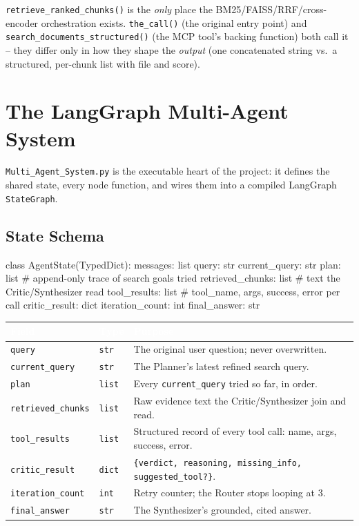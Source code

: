 \documentclass[11pt,a4paper]{article}
\begin{document}
\begin{successbox}
\texttt{retrieve\_ranked\_chunks()} is the \emph{only} place the
BM25/FAISS/RRF/cross-encoder orchestration exists. \texttt{the\_call()} (the
original entry point) and \texttt{search\_documents\_structured()} (the MCP
tool's backing function) both call it -- they differ only in how they shape
the \emph{output} (one concatenated string vs.\ a structured, per-chunk list
with file and score).
\end{successbox}



\clearpage
\section{The LangGraph Multi-Agent System}
\label{sec:langgraph}

\texttt{Multi\_Agent\_System.py} is the executable heart of the project: it
defines the shared state, every node function, and wires them into a
compiled LangGraph \texttt{StateGraph}.

\subsection{State Schema}

\begin{pycode}
class AgentState(TypedDict):
    messages: list
    query: str
    current_query: str
    plan: list                 # append-only trace of search goals tried
    retrieved_chunks: list     # text the Critic/Synthesizer read
    tool_results: list         # {tool_name, args, success, error} per call
    critic_result: dict
    iteration_count: int
    final_answer: str
\end{pycode}

\begin{tabularx}{\textwidth}{@{}l l X@{}}
\toprule
\rowcolor{navylight}
\textcolor{white}{\textbf{Field}} & \textcolor{white}{\textbf{Type}} & \textcolor{white}{\textbf{Purpose}} \\
\midrule
\texttt{query} & \texttt{str} & The original user question; never overwritten. \\
\texttt{current\_query} & \texttt{str} & The Planner's latest refined search query. \\
\texttt{plan} & \texttt{list} & Every \texttt{current\_query} tried so far, in order. \\
\texttt{retrieved\_chunks} & \texttt{list} & Raw evidence text the Critic/Synthesizer join and read. \\
\texttt{tool\_results} & \texttt{list} & Structured record of every tool call: name, args, success, error. \\
\texttt{critic\_result} & \texttt{dict} & \texttt{\{verdict, reasoning, missing\_info, suggested\_tool?\}}. \\
\texttt{iteration\_count} & \texttt{int} & Retry counter; the Router stops looping at 3. \\
\texttt{final\_answer} & \texttt{str} & The Synthesizer's grounded, cited answer. \\
\bottomrule
\end{tabularx}
\end{document}
